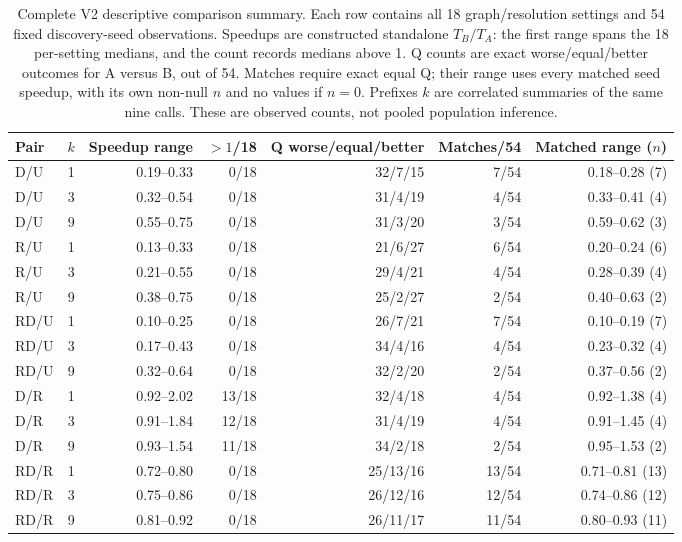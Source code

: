 \documentclass[sigconf,anonymous,review]{acmart}
\newcommand{\1}{\mathbf{1}}
\begin{document}
\begin{table}[t]
\caption{Complete V2 descriptive comparison summary. Each row contains all 18 graph/resolution settings and 54 fixed discovery-seed observations. Speedups are constructed standalone $T_B/T_A$: the first range spans the 18 per-setting medians, and the count records medians above 1. Q counts are exact worse/equal/better outcomes for A versus B, out of 54. Matches require exact equal Q; their range uses every matched seed speedup, with its own non-null $n$ and no values if $n=0$. Prefixes $k$ are correlated summaries of the same nine calls. These are observed counts, not pooled population inference.}\label{tab:v2-prefixes}
\centering\small
\begin{tabular}{lcrrrrr}\toprule
Pair & $k$ & Speedup range & $>1$/18 & Q worse/equal/better & Matches/54 & Matched range ($n$)\\\midrule
D/U & 1 & 0.19--0.33 & 0/18 & 32/7/15 & 7/54 & 0.18--0.28 (7)\\
D/U & 3 & 0.32--0.54 & 0/18 & 31/4/19 & 4/54 & 0.33--0.41 (4)\\
D/U & 9 & 0.55--0.75 & 0/18 & 31/3/20 & 3/54 & 0.59--0.62 (3)\\
R/U & 1 & 0.13--0.33 & 0/18 & 21/6/27 & 6/54 & 0.20--0.24 (6)\\
R/U & 3 & 0.21--0.55 & 0/18 & 29/4/21 & 4/54 & 0.28--0.39 (4)\\
R/U & 9 & 0.38--0.75 & 0/18 & 25/2/27 & 2/54 & 0.40--0.63 (2)\\
RD/U & 1 & 0.10--0.25 & 0/18 & 26/7/21 & 7/54 & 0.10--0.19 (7)\\
RD/U & 3 & 0.17--0.43 & 0/18 & 34/4/16 & 4/54 & 0.23--0.32 (4)\\
RD/U & 9 & 0.32--0.64 & 0/18 & 32/2/20 & 2/54 & 0.37--0.56 (2)\\
D/R & 1 & 0.92--2.02 & 13/18 & 32/4/18 & 4/54 & 0.92--1.38 (4)\\
D/R & 3 & 0.91--1.84 & 12/18 & 31/4/19 & 4/54 & 0.91--1.45 (4)\\
D/R & 9 & 0.93--1.54 & 11/18 & 34/2/18 & 2/54 & 0.95--1.53 (2)\\
RD/R & 1 & 0.72--0.80 & 0/18 & 25/13/16 & 13/54 & 0.71--0.81 (13)\\
RD/R & 3 & 0.75--0.86 & 0/18 & 26/12/16 & 12/54 & 0.74--0.86 (12)\\
RD/R & 9 & 0.81--0.92 & 0/18 & 26/11/17 & 11/54 & 0.80--0.93 (11)\\
\bottomrule\end{tabular}
\end{table}
\end{document}
